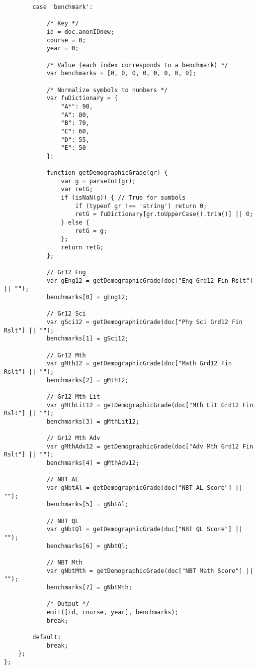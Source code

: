 \begin{verbatim}
        case 'benchmark':

            /* Key */
            id = doc.anonIDnew;
            course = 0;
            year = 0;

            /* Value (each index corresponds to a benchmark) */
            var benchmarks = [0, 0, 0, 0, 0, 0, 0, 0];

            /* Normalize symbols to numbers */
            var fuDictionary = {
                "A*": 90,
                "A": 80,
                "B": 70,
                "C": 60,
                "D": 55,
                "E": 50
            };

            function getDemographicGrade(gr) {
                var g = parseInt(gr);
                var retG;
                if (isNaN(g)) { // True for sumbols
                    if (typeof gr !== 'string') return 0;
                    retG = fuDictionary[gr.toUpperCase().trim()] || 0;
                } else {
                    retG = g;
                };
                return retG;
            };

            // Gr12 Eng
            var gEng12 = getDemographicGrade(doc["Eng Grd12 Fin Rslt"] || "");
            benchmarks[0] = gEng12;

            // Gr12 Sci
            var gSci12 = getDemographicGrade(doc["Phy Sci Grd12 Fin Rslt"] || "");
            benchmarks[1] = gSci12;

            // Gr12 Mth
            var gMth12 = getDemographicGrade(doc["Math Grd12 Fin Rslt"] || "");
            benchmarks[2] = gMth12;

            // Gr12 Mth Lit
            var gMthLit12 = getDemographicGrade(doc["Mth Lit Grd12 Fin Rslt"] || "");
            benchmarks[3] = gMthLit12;

            // Gr12 Mth Adv
            var gMthAdv12 = getDemographicGrade(doc["Adv Mth Grd12 Fin Rslt"] || "");
            benchmarks[4] = gMthAdv12;

            // NBT AL
            var gNbtAl = getDemographicGrade(doc["NBT AL Score"] || "");
            benchmarks[5] = gNbtAl;

            // NBT QL
            var gNbtQl = getDemographicGrade(doc["NBT QL Score"] || "");
            benchmarks[6] = gNbtQl;

            // NBT Mth
            var gNbtMth = getDemographicGrade(doc["NBT Math Score"] || "");
            benchmarks[7] = gNbtMth;

            /* Output */
            emit([id, course, year], benchmarks);
            break;

        default:
            break;
    };
};
\end{verbatim}